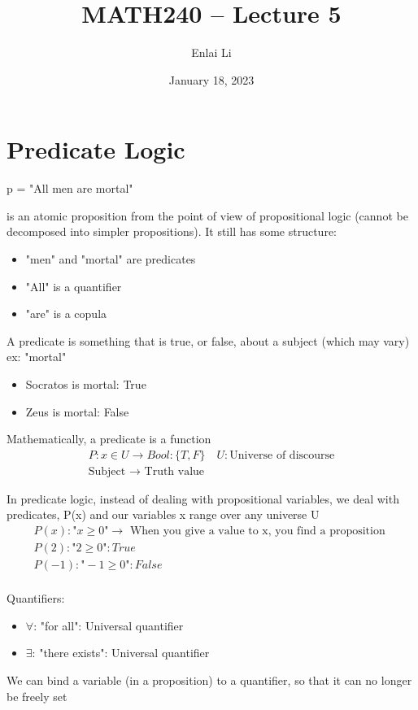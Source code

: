 \documentclass{article}
\author{Enlai Li}
\title{MATH240 -- Lecture 5}
\date{January 18, 2023}
\begin{document}
\maketitle
\section{Predicate Logic}
\begin{center}
    p = "All men are mortal"
\end{center}
is an atomic proposition from the point of view of propositional logic (cannot be decomposed into simpler propositions).
It still has some structure:
\begin{itemize}
    \item "men" and "mortal" are predicates
    \item "All" is a quantifier
    \item "are" is a copula
\end{itemize}

A predicate is something that is true, or false, about a subject (which may vary)
\\ex: "mortal"
\begin{itemize}
    \item Socratos is mortal: True
    \item Zeus is mortal: False
\end{itemize}

Mathematically, a predicate is a function
\begin{gather*}
    P: x\in U \rightarrow Bool:\{T,F\} \quad U: \text{Universe of discourse}\\
    \text{Subject } \rightarrow \text{ Truth value}
\end{gather*}

In predicate logic, instead of dealing with propositional variables, we deal with predicates, P(x) and our variables x range over any universe U
\begin{gather*}
    P(x): \text{"} x \ge 0 \text{"} \rightarrow \text{ When you give a value to x, you find a proposition } \\
    P(2): \text{"} 2 \ge 0 \text{"}: True \\
    P(-1): \text{"} -1 \ge 0 \text{"}: False \\
\end{gather*}

Quantifiers:
\begin{itemize}
    \item $\forall$: "for all": Universal quantifier
    \item $\exists$: "there exists": Universal quantifier
\end{itemize}

We can bind a variable (in a proposition) to a quantifier, so that it can no longer be freely set
\end{document}
